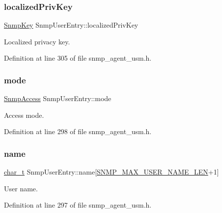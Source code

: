 \subsubsection{\texorpdfstring{localized\+Priv\+Key}{localizedPrivKey}}
{\footnotesize\ttfamily \hyperlink{structSnmpKey}{Snmp\+Key} Snmp\+User\+Entry\+::localized\+Priv\+Key}



Localized privacy key. 



Definition at line 305 of file snmp\+\_\+agent\+\_\+usm.\+h.

\mbox{\label{structSnmpUserEntry_af0824f5ebfa463d31b6d9983def956eb}} 
\subsubsection{\texorpdfstring{mode}{mode}}
{\footnotesize\ttfamily \hyperlink{snmp__agent__usm_8h_a45fe7ae59b303bb7c3a6067ffe2ed5ca}{Snmp\+Access} Snmp\+User\+Entry\+::mode}



Access mode. 



Definition at line 298 of file snmp\+\_\+agent\+\_\+usm.\+h.

\mbox{\label{structSnmpUserEntry_a60ae402e93fecec705e4f7ff0755360f}} 
\subsubsection{\texorpdfstring{name}{name}}
{\footnotesize\ttfamily \hyperlink{compiler__port_8h_a40bb5262bf908c328fbcfbe5d29d0201}{char\+\_\+t} Snmp\+User\+Entry\+::name\mbox{[}\hyperlink{snmp__common_8h_ae889f56d8038ef202bca4b1d974bd53f}{S\+N\+M\+P\+\_\+\+M\+A\+X\+\_\+\+U\+S\+E\+R\+\_\+\+N\+A\+M\+E\+\_\+\+L\+EN}+1\mbox{]}}



User name. 



Definition at line 297 of file snmp\+\_\+agent\+\_\+usm.\+h.

\mbox{\label{structSnmpUserEntry_a59bfb353ffa70a6791f0a6d5608ec0eb}} 
